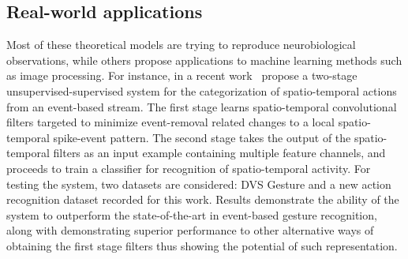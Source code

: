 \documentclass[brainsci, %
               review,submit,pdftex,moreauthors
               ]{Definitions/mdpi}
\begin{document}







\subsection{Real-world applications}
Most of these theoretical models are trying to reproduce neurobiological observations, while others propose applications to machine learning methods such as image processing. For instance, in a recent work~\citet{ghosh_spatiotemporal_2019} propose a two-stage unsupervised-supervised system for the categorization of spatio-temporal actions from an event-based stream. The first stage learns spatio-temporal convolutional filters targeted to minimize event-removal related changes to a local spatio-temporal spike-event pattern. The second stage takes the output of the spatio-temporal filters as an input example containing multiple feature channels, and proceeds to train a classifier for recognition of spatio-temporal activity. For testing the system, two datasets are considered: DVS Gesture and a new action recognition dataset recorded for this work. Results demonstrate the ability of the system to outperform the state-of-the-art in event-based gesture recognition, along with demonstrating superior performance to other alternative ways of obtaining the first stage filters thus showing the potential of such representation. 
\end{document}
